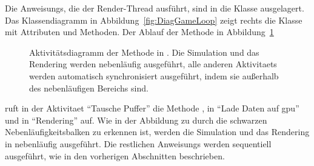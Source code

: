 Die \glspl{Anweisung}, die der Render-Thread ausführt, sind in die Klasse  ausgelagert. Das Klassendiagramm in Abbildung~\ref{fig:DiagGameLoop} zeigt rechts die Klasse  mit Attributen und Methoden. Der Ablauf der Methode  in Abbildung~\ref{fig:stepWindowActivity}
\begin{figure}
	\centering
	
	\caption[Aktivitätsdiagramm der Methode  in .]{Aktivitätsdiagramm der Methode  in . Die Simulation und das Rendering werden nebenläufig ausgeführt, alle anderen \glspl{Aktivitaet} werden automatisch synchronisiert ausgeführt, indem sie außerhalb des nebenläufigen Bereichs sind.}\label{fig:stepWindowActivity}
\end{figure}
ruft  in der \gls{Aktivitaet} \enquote{Tausche Puffer} die Methode , in \enquote{Lade Daten auf \ac{gpu}}  und in \enquote{Rendering}  auf. Wie in der Abbildung zu durch die schwarzen Nebenläufigkeitsbalken zu erkennen ist, werden die Simulation und das Rendering in  nebenläufig ausgeführt. Die restlichen \glspl{Anweisung} werden sequentiell ausgeführt, wie in den vorherigen Abschnitten beschrieben.